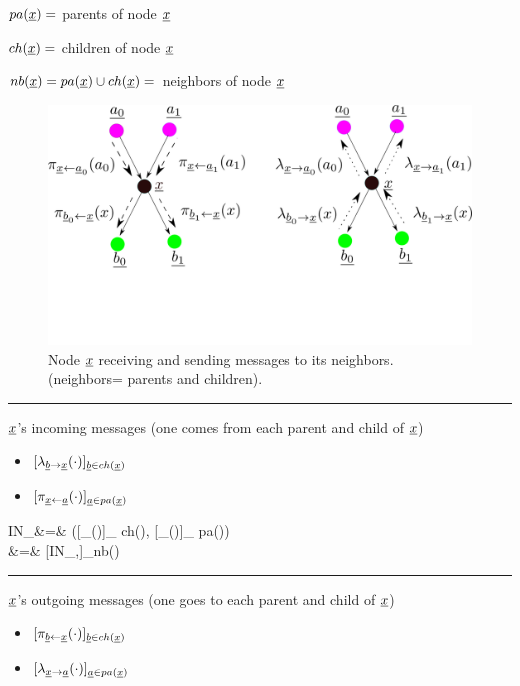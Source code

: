 $pa({\underline{x}})=$ parents of node ${\underline{x}}$

$ch({\underline{x}})=$ children of node ${\underline{x}}$

$nb({\underline{x}})=pa({\underline{x}})\cup ch({\underline{x}})=$ 
neighbors of node ${\underline{x}}$



\begin{figure}[h!]
\centering
\includegraphics[width=6in]{mpass/pi-lam.png}
\caption{Node ${\underline{x}}$ receiving
and sending messages to
 its neighbors. (neighbors=
parents and children).
} 
\label{fig-pi-lam}
\end{figure}




\hrule\noindent
${\underline{x}}$'s incoming messages (one
comes from
each parent and child of ${\underline{x}}$)

\begin{itemize}
\item 
$[\lambda_{{\underline{b}}\rightarrow{\underline{x}}}(\cdot)]_
{{\underline{b}}\in ch({\underline{x}})}$
\item
$[\pi_{{\underline{x}}\leftarrow{\underline{a}}}(\cdot)]_
{{\underline{a}}\in  pa({\underline{x}})}$
\end{itemize}

\beqa
IN_\rvx&=&
([\lam_{\rvb\rarrow\rvx}(\cdot)]_
{\rvb\in ch(\rvx)},
[\pi_{\rvx\larrow\rva}(\cdot)]_
{\rva\in  pa(\rvx)})
\\
&=&
[IN_{\rvx,\rvn}]_{\rvn\in nb(\rvx)}
\eeqa

\hrule\noindent
${\underline{x}}$'s outgoing messages
 (one goes to each parent 
and child of ${\underline{x}}$)

\begin{itemize}
\item
$[\pi_{{\underline{b}}\leftarrow{\underline{x}}}(\cdot)]_
{{\underline{b}}\in ch({\underline{x}})}$
\item 
$[\lambda_{{\underline{x}}\rightarrow{\underline{a}}}(\cdot)]_
{{\underline{a}}\in  pa({\underline{x}})}$
\end{itemize}

